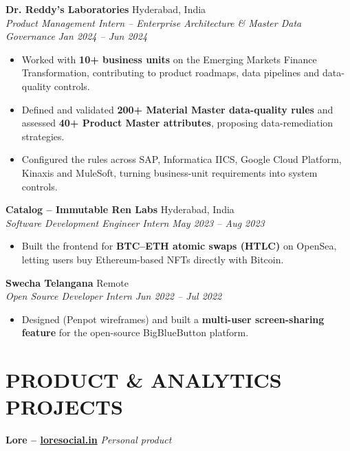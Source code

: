 \documentclass[a4paper,10pt]{extarticle}
\newcommand{\resumeSubheading}[4]{%
    \textbf{#1} \hfill #2\\
    \textit{#3} \hfill \textit{#4}}
\newcommand{\projectHeading}[2]{\textbf{#1} \hfill \textit{#2}}
\begin{document}
\vspace{3pt}
\resumeSubheading
{Dr. Reddy's Laboratories}
{Hyderabad, India}
{Product Management Intern -- Enterprise Architecture \& Master Data Governance}
{Jan 2024 -- Jun 2024}

\begin{itemize}
    \item Worked with \textbf{10+ business units} on the Emerging Markets Finance Transformation,
    contributing to product roadmaps, data pipelines and data-quality controls.

    \item Defined and validated \textbf{200+ Material Master data-quality rules} and assessed
    \textbf{40+ Product Master attributes}, proposing data-remediation strategies.

    \item Configured the rules across SAP, Informatica IICS, Google Cloud Platform, Kinaxis and
    MuleSoft, turning business-unit requirements into system controls.
\end{itemize}

\vspace{3pt}
\resumeSubheading
{Catalog -- Immutable Ren Labs}
{Hyderabad, India}
{Software Development Engineer Intern}
{May 2023 -- Aug 2023}

\begin{itemize}
    \item Built the frontend for \textbf{BTC--ETH atomic swaps (HTLC)} on OpenSea, letting users buy
    Ethereum-based NFTs directly with Bitcoin.
\end{itemize}

\vspace{3pt}
\resumeSubheading
{Swecha Telangana}
{Remote}
{Open Source Developer Intern}
{Jun 2022 -- Jul 2022}

\begin{itemize}
    \item Designed (Penpot wireframes) and built a \textbf{multi-user screen-sharing feature} for the
    open-source BigBlueButton platform.
\end{itemize}

\section*{PRODUCT \& ANALYTICS PROJECTS}

\projectHeading
{Lore -- \href{https://loresocial.in}{loresocial.in}}
{Personal product}
\end{document}
